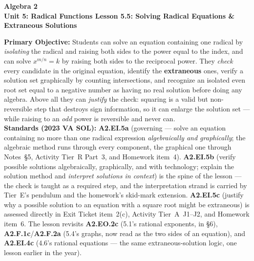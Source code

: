 \documentclass[10pt]{article}
\newcommand{\CourseName}{Algebra 2}
\newcommand{\UnitNumberName}{Unit 5: Radical Functions \quad}
\newcommand{\LessonNumberName}{Lesson 5.5: Solving Radical Equations \& Extraneous Solutions}
\begin{document}
\begin{center}
    {\Large\bfseries \CourseName \\
    {\small\bfseries \UnitNumberName \LessonNumberName}}
\end{center}

\begin{tcolorbox}[colback=forestbg, colframe=forest, boxrule=0.9pt, arc=2mm,
    left=2mm, right=2mm, top=1.5mm, bottom=1.5mm]
    \textbf{Primary Objective:} Students can solve an equation containing one radical by
    \emph{isolating} the radical and raising both sides to the power equal to the index, and can
    solve $x^{m/n}=k$ by raising both sides to the reciprocal power. They \emph{check} every
    candidate in the original equation, identify the \textbf{extraneous} ones, verify a solution set
    graphically by counting intersections, and recognize an isolated even root set equal to a
    negative number as having no real solution before doing any algebra. Above all they can
    \emph{justify} the check: squaring is a valid but non-reversible step that destroys sign
    information, so it can enlarge the solution set --- while raising to an \emph{odd} power is
    reversible and never can.
    \\[2pt]
    \textbf{Standards (2023 VA SOL):} \textbf{A2.EI.5a} (governing --- solve an equation containing
    no more than one radical expression \emph{algebraically and graphically}; the algebraic method
    runs through every component, the graphical one through Notes~\S5, Activity Tier~R Part~3, and
    Homework item~4). \textbf{A2.EI.5b} (verify possible solutions algebraically, graphically, and
    with technology; explain the solution method and \emph{interpret solutions in context}) is the
    spine of the lesson --- the check is taught as a required step, and the interpretation strand is
    carried by Tier~E's pendulum and the homework's skid-mark extension. \textbf{A2.EI.5c} (justify
    why a possible solution to an equation with a square root might be extraneous) is assessed
    directly in Exit Ticket item~2(c), Activity Tier~A~J1--J2, and Homework item~6. The lesson
    revisits \textbf{A2.EO.2c} (5.1's rational exponents, in \S6), \textbf{A2.F.1c}/\textbf{A2.F.2a}
    (5.4's graphs, now read as the two sides of an equation), and \textbf{A2.EI.4c} (4.6's rational
    equations --- the same extraneous-solution logic, one lesson earlier in the year).
\end{tcolorbox}
\end{document}
